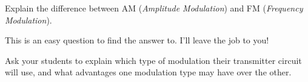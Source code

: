 

Explain the difference between AM ({\it Amplitude Modulation}) and FM ({\it Frequency Modulation}).







This is an easy question to find the answer to.  I'll leave the job to you!







Ask your students to explain which type of modulation their transmitter circuit will use, and what advantages one modulation type may have over the other.




